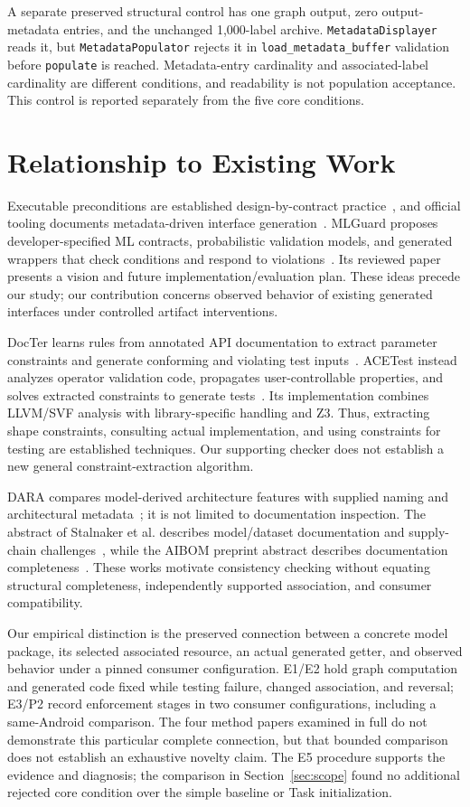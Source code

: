 \documentclass[10pt,twocolumn,letterpaper]{article}
\newcommand{\code}[1]{\texttt{#1}}
\begin{document}
A separate preserved structural control has one graph output, zero output-metadata entries, and the unchanged 1,000-label archive. \code{MetadataDisplayer} reads it, but \code{MetadataPopulator} rejects it in \code{load\_metadata\_buffer} validation before \code{populate} is reached. Metadata-entry cardinality and associated-label cardinality are different conditions, and readability is not population acceptance. This control is reported separately from the five core conditions.

\section{Relationship to Existing Work}
Executable preconditions are established design-by-contract practice~\cite{meyer}, and official tooling documents metadata-driven interface generation~\cite{codegen-doc}. MLGuard proposes developer-specified ML contracts, probabilistic validation models, and generated wrappers that check conditions and respond to violations~\cite{mlguard}. Its reviewed paper presents a vision and future implementation/evaluation plan. These ideas precede our study; our contribution concerns observed behavior of existing generated interfaces under controlled artifact interventions.

DocTer learns rules from annotated API documentation to extract parameter constraints and generate conforming and violating test inputs~\cite{docter}. ACETest instead analyzes operator validation code, propagates user-controllable properties, and solves extracted constraints to generate tests~\cite{acetest}. Its implementation combines LLVM/SVF analysis with library-specific handling and Z3. Thus, extracting shape constraints, consulting actual implementation, and using constraints for testing are established techniques. Our supporting checker does not establish a new general constraint-extraction algorithm.

DARA compares model-derived architecture features with supplied naming and architectural metadata~\cite{dara}; it is not limited to documentation inspection. The abstract of Stalnaker et al. describes model/dataset documentation and supply-chain challenges~\cite{stalnaker}, while the AIBOM preprint abstract describes documentation completeness~\cite{aibom}. These works motivate consistency checking without equating structural completeness, independently supported association, and consumer compatibility.

Our empirical distinction is the preserved connection between a concrete model package, its selected associated resource, an actual generated getter, and observed behavior under a pinned consumer configuration. E1/E2 hold graph computation and generated code fixed while testing failure, changed association, and reversal; E3/P2 record enforcement stages in two consumer configurations, including a same-Android comparison. The four method papers examined in full do not demonstrate this particular complete connection, but that bounded comparison does not establish an exhaustive novelty claim. The E5 procedure supports the evidence and diagnosis; the comparison in Section~\ref{sec:scope} found no additional rejected core condition over the simple baseline or Task initialization.
\end{document}
